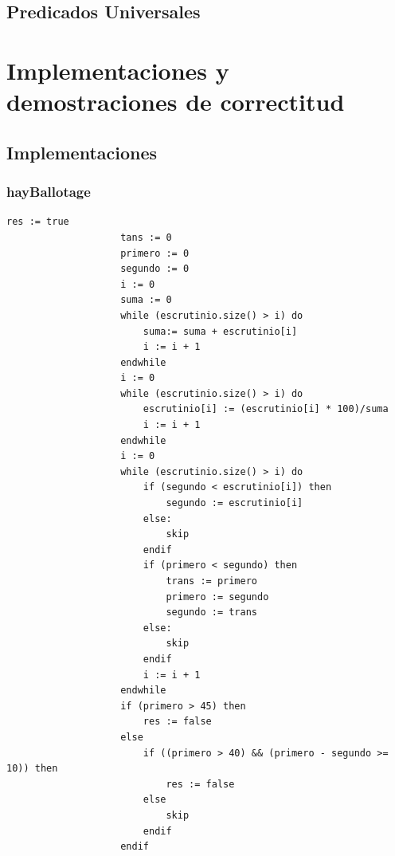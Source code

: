 \documentclass[10pt,a4paper]{article}
\begin{document}
	\subsection{Predicados Universales}
		
		
	
		
		
		


\section{Implementaciones y demostraciones de correctitud}

	\subsection{Implementaciones}
		
		\subsubsection{hayBallotage}
			\begin{minipage}[t]{\textwidth}
				\begin{lstlisting}[caption={()},label=code:for]
					res := true
					tans := 0
					primero := 0
					segundo := 0
					i := 0
					suma := 0
					while (escrutinio.size() > i) do
						suma:= suma + escrutinio[i]
						i := i + 1
					endwhile
					i := 0
					while (escrutinio.size() > i) do
						escrutinio[i] := (escrutinio[i] * 100)/suma
						i := i + 1
					endwhile
					i := 0
					while (escrutinio.size() > i) do 
						if (segundo < escrutinio[i]) then
							segundo := escrutinio[i]
						else:
							skip
						endif
						if (primero < segundo) then
							trans := primero
							primero := segundo
							segundo := trans
						else:
							skip
						endif
						i := i + 1
					endwhile
					if (primero > 45) then
						res := false
					else
						if ((primero > 40) && (primero - segundo >= 10)) then
							res := false
						else
							skip
						endif
					endif

				\end{lstlisting}
			\end{minipage}
\end{document}
